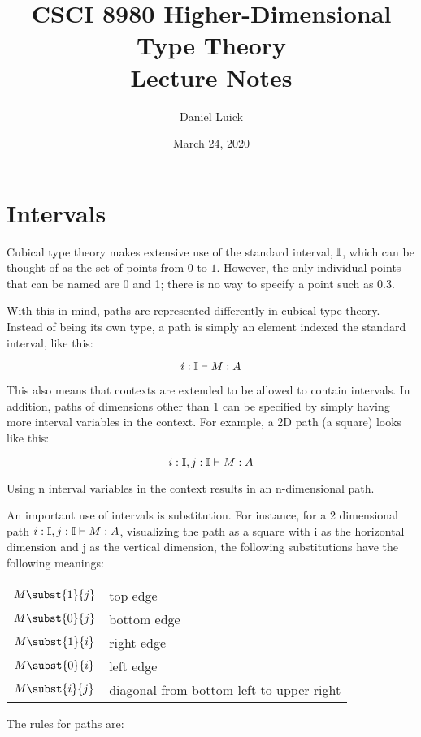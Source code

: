 \documentclass[11pt]{article}
\title{CSCI 8980 Higher-Dimensional Type Theory\\ Lecture Notes}
\author{Daniel Luick}
\date{March 24, 2020}
\begin{document}
\maketitle

\section{Intervals}
Cubical type theory makes extensive use of the standard interval, $\mathbb{I}$, which can be thought of as the set of points from $0$ to $1$. However, the only individual points that can be named are 0 and 1; there is no way to specify a point such as 0.3.

With this in mind, paths are represented differently in cubical type theory. Instead of being its own type, a path is simply an element indexed the standard interval, like this:

\[\oftype{\oftype{i}{\bI}}{M}{A}\]

This also means that contexts are extended to be allowed to contain intervals. In addition, paths of dimensions other than 1 can be specified by simply having more interval variables in the context. For example, a 2D path (a square) looks like this:

\[\oftype{\oftype{i}{\bI},\oftype{j}{\bI}}{M}{A}\]

Using n interval variables in the context results in an n-dimensional path.

An important use of intervals is substitution. For instance, for a 2 dimensional path  $\oftype{\oftype{i}{\bI},\oftype{j}{\bI}}{M}{A}$, visualizing the path as a square with i as the horizontal dimension and j as the vertical dimension, the following substitutions have the following meanings:

\begin{center}
    \begin{tabular}{cl}
        $M\subst{1}{j}$ & top edge\\
        $M\subst{0}{j}$ & bottom edge\\
        $M\subst{1}{i}$ & right edge \\
        $M\subst{0}{i}$ & left edge\\
        $M\subst{i}{j}$ & diagonal from bottom left to upper right
    \end{tabular}
\end{center}

The rules for paths are:

\begin{prooftree*}
\end{prooftree*}
\end{document}
